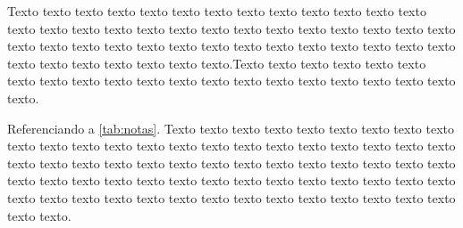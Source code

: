 Texto texto texto texto texto texto texto texto texto texto texto texto texto texto texto texto texto texto texto texto texto texto texto texto texto texto texto texto texto texto texto texto texto texto texto texto texto texto texto texto texto texto texto texto texto texto texto texto.Texto texto texto texto texto texto texto texto texto texto texto texto texto texto texto texto texto texto texto texto texto.

Referenciando a \autoref{tab:notas}. Texto texto texto texto texto texto texto texto texto texto texto texto texto texto texto texto texto texto texto texto texto texto texto texto texto texto texto texto texto texto texto texto texto texto texto texto texto texto texto texto texto texto texto texto texto texto texto texto texto texto texto texto texto texto texto texto texto texto texto texto texto texto texto texto texto texto texto.